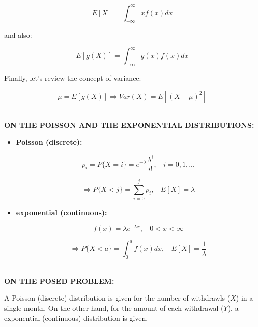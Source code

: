 \documentclass[paper=a4, fontsize=11pt]{scrartcl} %
\numberwithin{equation}{section} %
\numberwithin{figure}{section} %
\numberwithin{table}{section} %
\begin{document}
\begin{equation}
E[X] = \int_{-\infty}^{\infty}xf(x)dx
\end{equation}

and also:

\begin{equation}
E[g(X)] = \int_{-\infty}^{\infty}g(x)f(x)dx
\end{equation}

Finally, let's review the concept of variance:

\begin{equation}
\mu = E[g(X)] \Rightarrow Var(X) = E[(X-\mu)^{2}]
\end{equation}


\ \\
\textbf{ON THE POISSON AND THE EXPONENTIAL DISTRIBUTIONS:}

\begin{itemize}
\item \textbf{Poisson (discrete):}

\begin{equation}
p_{i} = P\{ X = i \} = e^{-\lambda}\frac{\lambda^{i}}{i!}, \ \ \ \ i = 0, 1, ...
\label{eq:poisson1}
\end{equation}

\begin{equation}
\Rightarrow P\{ X < j \} = \sum_{i=0}^{j}p_{i}, \ \ \ \ E[X] = \lambda
\label{eq:poisson2}
\end{equation}

\item \textbf{exponential (continuous):}

\begin{equation}
f(x) = \lambda e^{-\lambda x}, \ \ \ \ 0<x<\infty
\label{eq:exponential1}
\end{equation}

\begin{equation}
\Rightarrow P\{ X < a \} = \int_{0}^{a}f(x)dx, \ \ \ \ E[X] = \frac{1}{\lambda}
\label{eq:exponential2}
\end{equation}


\end{itemize}


\ \\
\textbf{ON THE POSED PROBLEM:}

A Poisson (discrete) distribution is given for the number of withdrawls ($X$) in a single month. On the other hand, for the amount of each withdrawal ($Y$), a exponential (continuous) distribution is given.
\end{document}
